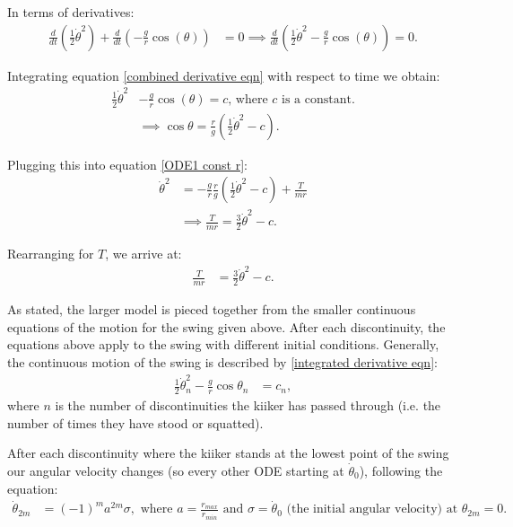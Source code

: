 \documentclass[12pt]{article}
\begin{document}
In terms of derivatives:
\begin{align}
    \frac{d}{dt}(\frac{1}{2}\dot{\theta}^2) + \frac{d}{dt}(-\frac{g}{r}\cos(\theta)) &= 0
    \implies \frac{d}{dt}(\frac{1}{2}\dot{\theta}^2 - \frac{g}{r}\cos(\theta)) = 0. \label{combined derivative eqn}
\end{align}

Integrating equation \ref{combined derivative eqn} with respect to time we obtain:
\begin{align}
    \frac{1}{2}\dot{\theta}^2 &- \frac{g}{r}\cos(\theta) = c \label{integrated derivative eqn}\text{,  where $c$ is a constant.}
    \\&\implies{\cos{\theta} = \frac{r}{g}(\frac{1}{2}\dot{\theta}^2 - c)}.
\end{align}

Plugging this into equation \ref{ODE1 const r}:
\begin{align}
    \dot{\theta}^2 &= -\frac{g}{r} \frac{r}{g}(\frac{1}{2}\dot{\theta}^2 - c) + \frac{T}{mr}
    \\&\implies \frac{T}{mr} = \frac{3}{2}\dot{\theta}^2 - c.
\end{align}

Rearranging for $T$, we arrive at:
\begin{align}
    \frac{T}{mr} &= \frac{3}{2}\dot{\theta}^2 - c.
    \label{tension eqn}
\end{align}

As stated, the larger model is pieced together from the smaller continuous equations of the motion for the swing given above.
After each discontinuity, the equations above apply to the swing with different initial conditions.
Generally, the continuous motion of the swing is described by \ref{integrated derivative eqn}:
\begin{align}
    \frac{1}{2}\dot{\theta}^2_n - \frac{g}{r}\cos{\theta_n}&= c_n,
    \label{coninuous motion eqn}
\end{align}
where $n$ is the number of discontinuities the kiiker has passed through (i.e. the number of times they have stood or squatted).

After each discontinuity where the kiiker stands at the lowest point of the swing our angular velocity changes (so every other ODE starting at $\dot{\theta}_0$), following the equation:
\begin{align}
    \dot{\theta}_{2m} &= (-1)^{m} a^{2m}\sigma,
    \label{discontinuity reln}
    \text{ where $a = \frac{r_{max}}{r_{min}}$ and $\sigma = \dot{\theta}_0$ (the initial angular velocity) at } \theta_{2m} = 0.
\end{align}
\end{document}
